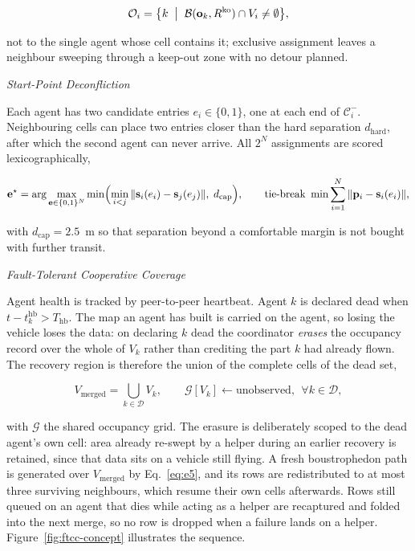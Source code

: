 \documentclass[10pt,letterpaper]{article}
\newcommand{\headingthree}[1]{%
    \par\vspace{6pt}%
    {\centering\fontsize{10}{12}\selectfont\itshape #1\par}%
    \vspace{2pt}\noindent\ignorespaces}
\begin{document}
\begin{equation}
    \label{eq:e7}
    \mathcal{O}_i=\bigl\{k \;\bigm|\;
    \mathcal{B}(\mathbf{o}_k,R^{\mathrm{ko}})\cap V_i\neq\emptyset\bigr\},
\end{equation}

not to the single agent whose cell contains it; exclusive assignment leaves a neighbour
sweeping through a keep-out zone with no detour planned.

\headingthree{Start-Point Deconfliction}

Each agent has two candidate entries $e_i\in\{0,1\}$, one at each end of $\mathcal{C}^-_i$.
Neighbouring cells can place two entries closer than the hard separation $d_{\mathrm{hard}}$,
after which the second agent can never arrive. All $2^N$ assignments are scored
lexicographically,

\begin{equation}
    \label{eq:e8}
    \mathbf{e}^\star=\arg\max_{\mathbf{e}\in\{0,1\}^N}
    \min\Bigl(\min_{i<j}\|\mathbf{s}_i(e_i)-\mathbf{s}_j(e_j)\|,\;d_{\mathrm{cap}}\Bigr),
    \qquad
    \text{tie-break } \min\sum_{i=1}^{N}\|\mathbf{p}_i-\mathbf{s}_i(e_i)\|,
\end{equation}

with $d_{\mathrm{cap}}=2.5$~m so that separation beyond a comfortable margin is not bought
with further transit.

\headingthree{Fault-Tolerant Cooperative Coverage}

Agent health is tracked by peer-to-peer heartbeat. Agent $k$ is declared dead when
$t-t_k^{\mathrm{hb}}>T_{\mathrm{hb}}$. The map an agent has built is carried on the agent, so
losing the vehicle loses the data: on declaring $k$ dead the coordinator \emph{erases} the
occupancy record over the whole of $V_k$ rather than crediting the part $k$ had already
flown. The recovery region is therefore the union of the complete cells of the dead set,

\begin{equation}
    \label{eq:e9}
    V_{\mathrm{merged}}=\bigcup_{k\in\mathcal{D}}V_k ,
    \qquad
    \mathcal{G}\!\left[V_k\right]\leftarrow\text{unobserved},\ \ \forall k\in\mathcal{D},
\end{equation}

with $\mathcal{G}$ the shared occupancy grid. The erasure is deliberately scoped to the dead
agent's own cell: area already re-swept by a helper during an earlier recovery is retained,
since that data sits on a vehicle still flying. A fresh boustrophedon path is generated over
$V_{\mathrm{merged}}$ by Eq.~\eqref{eq:e5}, and its rows are redistributed to at most three
surviving neighbours, which resume their own cells afterwards. Rows still queued on an agent
that dies while acting as a helper are recaptured and folded into the next merge, so no row
is dropped when a failure lands on a helper. Figure~\ref{fig:ftcc-concept} illustrates the
sequence.
\end{document}
